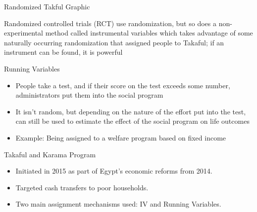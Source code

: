 \documentclass{beamer}
\begin{document}
\begin{frame}{Randomized Takful Graphic}
\begin{center}
\end{center}

\bigskip

Randomized controlled trials (RCT) use randomization, but so does a non-experimental method called instrumental variables which takes advantage of some naturally occurring randomization that assigned people to Takaful; if an instrument can be found, it is powerful

\end{frame}





\begin{frame}{Running Variables}
\begin{itemize}
\item People take a test, and if their score on the test exceeds some number, administrators put them into the social program
\item It isn't random, but depending on the nature of the effort put into the test, can still be used to estimate the effect of the social program on life outcomes
\item Example: Being assigned to a welfare program based on fixed income
\end{itemize}
\end{frame}

\begin{frame}{Takaful and Karama Program}
\begin{itemize}
\item Initiated in 2015 as part of Egypt's economic reforms from 2014.
\item Targeted cash transfers to poor households.
\item Two main assignment mechanisms used: IV and Running Variables.
\end{itemize}
\end{frame}
\end{document}
